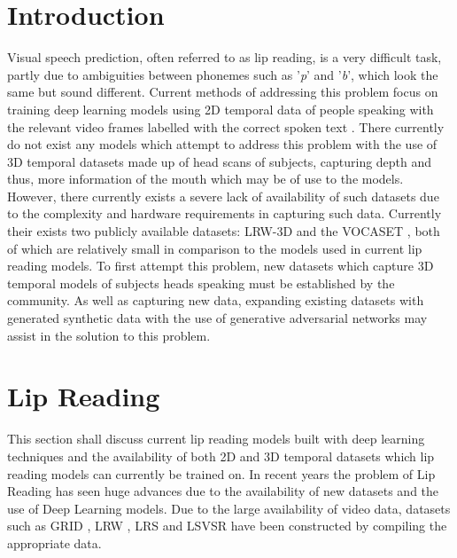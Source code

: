\documentclass[12pt]{article}
\begin{document}


\setcounter{page}{1}
\clearpage{\pagestyle{empty}\cleardoublepage}

\tableofcontents 
\clearpage{\pagestyle{empty}\cleardoublepage}


\setcounter{page}{1}
\frenchspacing

\section{Introduction}

Visual speech prediction, often referred to as lip reading, is a very difficult task, partly due to ambiguities between phonemes such as '\textit{p}' and '\textit{b}', which look the same but sound different.
Current methods of addressing this problem focus on training deep learning models using 2D temporal data of people speaking with the relevant video frames labelled with the correct spoken text \cite{Chung2016, Assael2016, Chung2017, Shillingford2018}.
There currently do not exist any models which attempt to address this problem with the use of 3D temporal datasets made up of head scans of subjects, capturing depth and thus, more information of the mouth which may be of use to the models.
However, there currently exists a severe lack of availability of such datasets due to the complexity and hardware requirements in capturing such data.
Currently their exists two publicly available datasets: LRW-3D \cite{Tzirakis2019} and the VOCASET \cite{Cudeiro2019}, both of which are relatively small in comparison to the models used in current lip reading models.
To first attempt this problem, new datasets which capture 3D temporal models of subjects heads speaking must be established by the community.
As well as capturing new data, expanding existing datasets with generated synthetic data with the use of generative adversarial networks may assist in the solution to this problem.

\section{Lip Reading}
This section shall discuss current lip reading models built with deep learning techniques and the availability of both 2D and 3D temporal datasets which lip reading models can currently be trained on.
In recent years the problem of Lip Reading has seen huge advances due to the availability of new datasets and the use of Deep Learning models.
Due to the large availability of video data, datasets such as GRID \cite{Cooke2006}, LRW \cite{Chung2016}, LRS \cite{Chung2017} and LSVSR \cite{Shillingford2018} have been constructed by compiling the appropriate data.
\end{document}
